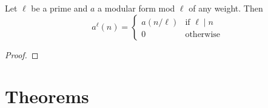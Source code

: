 


\begin{theorem} 
  \label{thm:coeff_pow_Prime}
  \leanok
  Let $\ell$ be a prime and $a$ a modular form mod $\ell$ of any weight. Then \\
  \[a ^ \ell (n) = \begin{cases} a (n / \ell) & \text{if $\ell \mid n$} \\
    0 & \text{otherwise} \end{cases} \]
\end{theorem}
\begin{proof}
  \leanok
\end{proof}



\section{Theorems}

